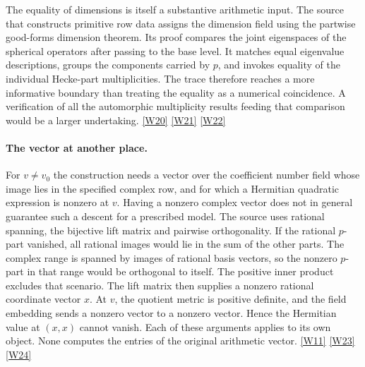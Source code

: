 \documentclass[12pt,letterpaper]{article}
\begin{document}
The equality of dimensions is itself a substantive arithmetic input. The source that constructs primitive row data assigns the dimension field using the partwise good-forms dimension theorem. Its proof compares the joint eigenspaces of the spherical operators after passing to the base level. It matches equal eigenvalue descriptions, groups the components carried by \(p\), and invokes equality of the individual Hecke-part multiplicities. The trace therefore reaches a more informative boundary than treating the equality as a numerical coincidence. A verification of all the automorphic multiplicity results feeding that comparison would be a larger undertaking. \href{https://github.com/nousentllc/riemann-hypothesis/blob/40e56bab026552e089d7afcfeff08d2defb9c005/src/Development/AbelianVarietyTheory/Proofs/DivisorProofs/PrimRows3OfParts.lean#L24-L50}{\textsf{[W20]}} \href{https://github.com/nousentllc/riemann-hypothesis/blob/40e56bab026552e089d7afcfeff08d2defb9c005/src/Development/AbelianVarietyTheory/Proofs/DivisorProofs/BaseLevelGoodFormsDimsAgreePartwise.lean#L21-L23}{\textsf{[W21]}} \href{https://github.com/nousentllc/riemann-hypothesis/blob/40e56bab026552e089d7afcfeff08d2defb9c005/src/Development/AbelianVarietyTheory/Proofs/DivisorProofs/TwSubISupInfLevel.lean#L92-L173}{\textsf{[W22]}}

\paragraph{The vector at another place.}
For \(v\ne v_0\) the construction needs a vector over the coefficient number field whose image lies in the specified complex row, and for which a Hermitian quadratic expression is nonzero at \(v\). Having a nonzero complex vector does not in general guarantee such a descent for a prescribed model. The source uses rational spanning, the bijective lift matrix and pairwise orthogonality. If the rational \(p\)-part vanished, all rational images would lie in the sum of the other parts. The complex range is spanned by images of rational basis vectors, so the nonzero \(p\)-part in that range would be orthogonal to itself. The positive inner product excludes that scenario. The lift matrix then supplies a nonzero rational coordinate vector \(x\). At \(v\), the quotient metric is positive definite, and the field embedding sends a nonzero vector to a nonzero vector. Hence the Hermitian value at \((x,x)\) cannot vanish. Each of these arguments applies to its own object. None computes the entries of the original arithmetic vector. \href{https://github.com/nousentllc/riemann-hypothesis/blob/40e56bab026552e089d7afcfeff08d2defb9c005/src/Development/AbelianVarietyTheory/Proofs/IwasawaDecomposition/RowPartFormsAndNonzeroVectorsEveryPlace.lean#L16-L32}{\textsf{[W11]}} \href{https://github.com/nousentllc/riemann-hypothesis/blob/40e56bab026552e089d7afcfeff08d2defb9c005/src/Development/AbelianVarietyTheory/Proofs/IwasawaDecomposition/ExistsNonzeroRationalLiftMemBasePart.lean#L11-L77}{\textsf{[W23]}} \href{https://github.com/nousentllc/riemann-hypothesis/blob/40e56bab026552e089d7afcfeff08d2defb9c005/src/Development/AbelianVarietyTheory/Proofs/IwasawaDecomposition/BaseLevelFramesHermitianNeZeroOffPlace.lean#L15-L45}{\textsf{[W24]}}
\end{document}
